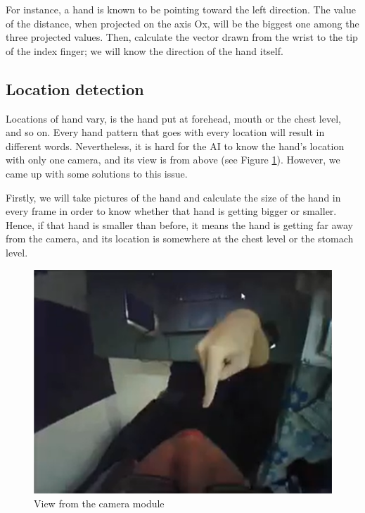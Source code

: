 For instance, a hand is known to be pointing toward the left direction. The value of the distance, when projected on the axis Ox, will be the biggest one among the three projected values. Then, calculate the vector drawn from the wrist to the tip of the index finger; we will know the direction of the hand itself.

\subsection{Location detection}

Locations of hand vary, is the hand put at forehead, mouth or the chest level, and so on. Every hand pattern that goes with every location will result in different words. Nevertheless, it is hard for the AI to know the hand’s location with only one camera, and its view is from above (see Figure \ref{fig:Chap3-ViewFromCamera}). However, we came up with some solutions to this issue.

Firstly, we will take pictures of the hand and calculate the size of the hand in every frame in order to know whether that hand is getting bigger or smaller. Hence, if that hand is smaller than before, it means the hand is getting far away from the camera, and its location is somewhere at the chest level or the stomach level.

\begin{figure}[H]
  \centering
  \includegraphics[width=\textwidth]{img/Chap3/ViewFromCamera.png}
  \caption{View from the camera module}
  \label{fig:Chap3-ViewFromCamera}
\end{figure}

